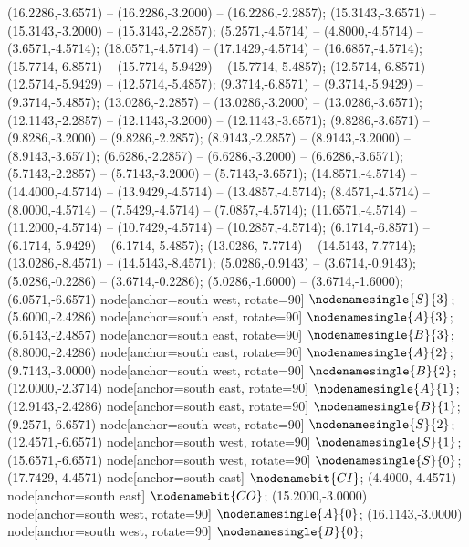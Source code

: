    (16.2286,-3.6571) -- (16.2286,-3.2000) -- (16.2286,-2.2857);
   (15.3143,-3.6571) -- (15.3143,-3.2000) -- (15.3143,-2.2857);
   (5.2571,-4.5714) -- (4.8000,-4.5714) -- (3.6571,-4.5714);
   (18.0571,-4.5714) -- (17.1429,-4.5714) -- (16.6857,-4.5714);
   (15.7714,-6.8571) -- (15.7714,-5.9429) -- (15.7714,-5.4857);
   (12.5714,-6.8571) -- (12.5714,-5.9429) -- (12.5714,-5.4857);
   (9.3714,-6.8571) -- (9.3714,-5.9429) -- (9.3714,-5.4857);
   (13.0286,-2.2857) -- (13.0286,-3.2000) -- (13.0286,-3.6571);
   (12.1143,-2.2857) -- (12.1143,-3.2000) -- (12.1143,-3.6571);
   (9.8286,-3.6571) -- (9.8286,-3.2000) -- (9.8286,-2.2857);
   (8.9143,-2.2857) -- (8.9143,-3.2000) -- (8.9143,-3.6571);
   (6.6286,-2.2857) -- (6.6286,-3.2000) -- (6.6286,-3.6571);
   (5.7143,-2.2857) -- (5.7143,-3.2000) -- (5.7143,-3.6571);
   (14.8571,-4.5714) -- (14.4000,-4.5714) -- (13.9429,-4.5714) -- (13.4857,-4.5714);
   (8.4571,-4.5714) -- (8.0000,-4.5714) -- (7.5429,-4.5714) -- (7.0857,-4.5714);
   (11.6571,-4.5714) -- (11.2000,-4.5714) -- (10.7429,-4.5714) -- (10.2857,-4.5714);
   (6.1714,-6.8571) -- (6.1714,-5.9429) -- (6.1714,-5.4857);
   (13.0286,-7.7714) -- (14.5143,-7.7714);
   (13.0286,-8.4571) -- (14.5143,-8.4571);
   (5.0286,-0.9143) -- (3.6714,-0.9143);
   (5.0286,-0.2286) -- (3.6714,-0.2286);
   (5.0286,-1.6000) -- (3.6714,-1.6000);
   (6.0571,-6.6571) node[anchor=south west, rotate=90] {$\nodenamesingle{S}{3}$};
   (5.6000,-2.4286) node[anchor=south east, rotate=90] {$\nodenamesingle{A}{3}$};
   (6.5143,-2.4857) node[anchor=south east, rotate=90] {$\nodenamesingle{B}{3}$};
   (8.8000,-2.4286) node[anchor=south east, rotate=90] {$\nodenamesingle{A}{2}$};
   (9.7143,-3.0000) node[anchor=south west, rotate=90] {$\nodenamesingle{B}{2}$};
   (12.0000,-2.3714) node[anchor=south east, rotate=90] {$\nodenamesingle{A}{1}$};
   (12.9143,-2.4286) node[anchor=south east, rotate=90] {$\nodenamesingle{B}{1}$};
   (9.2571,-6.6571) node[anchor=south west, rotate=90] {$\nodenamesingle{S}{2}$};
   (12.4571,-6.6571) node[anchor=south west, rotate=90] {$\nodenamesingle{S}{1}$};
   (15.6571,-6.6571) node[anchor=south west, rotate=90] {$\nodenamesingle{S}{0}$};
   (17.7429,-4.4571) node[anchor=south east] {$\nodenamebit{CI}$};
   (4.4000,-4.4571) node[anchor=south east] {$\nodenamebit{CO}$};
   (15.2000,-3.0000) node[anchor=south west, rotate=90] {$\nodenamesingle{A}{0}$};
   (16.1143,-3.0000) node[anchor=south west, rotate=90] {$\nodenamesingle{B}{0}$};
